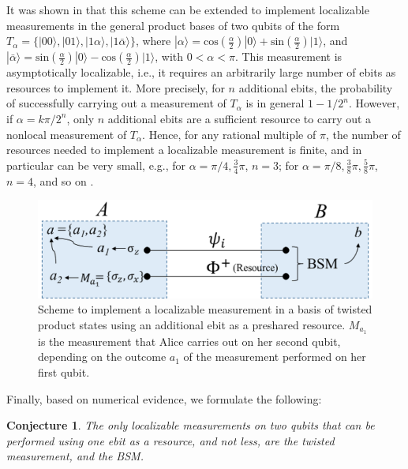 \documentclass[12pt]{article}
\newcommand{\ket}[1]{| {#1} \rangle} %
\newtheorem{conj}{Conjecture}
\begin{document}
It was shown in \cite{groisman2002measurements, groisman2003instantaneous} that this scheme can be extended to implement localizable measurements in the general product bases of two qubits of the form $T_\alpha=\{\ket{00}, \ket{01}, \ket{1   \alpha}, \ket{1\bar{\alpha}}\}$, where $\ket{\alpha}=\text{cos}(\frac{\alpha}{2})\ket 0 + \text{sin}(\frac{\alpha}{2})\ket 1$, and $\ket{\bar \alpha}=\text{sin}(\frac{\alpha}{2})\ket 0 - \text{cos}(\frac{\alpha}{2})\ket 1$, with $0<\alpha<\pi$. This measurement is asymptotically localizable, i.e., it requires an arbitrarily large number of ebits as resources to implement it. More precisely, for $n$ additional ebits, the probability of successfully carrying out a measurement of $T_\alpha$ is in general $1-1/2^n$. However, if $\alpha=k\pi/2^n$, only $n$ additional ebits are a sufficient resource to carry out a nonlocal measurement of $T_{\alpha}$. Hence, for any rational multiple of $\pi$, the number of resources needed to implement a localizable measurement is finite, and in particular can be very small, e.g., for $\alpha=\pi/4, \frac{3}{4}\pi$, $n=3$; for $\alpha=\pi/8, \frac{3}{8}\pi, \frac{5}{8}\pi$, $n=4$, and so on  \cite{groisman2002measurements}. 

 \begin{figure}[ht]
    \centering    \includegraphics[width=.48\textwidth]{twisted_local.png}
    \caption{Scheme to implement a localizable measurement in a basis of  twisted product  states using an additional ebit as a preshared resource. $M_{a_1}$ is the measurement that Alice carries out on her second qubit, depending on the outcome $a_1$ of the measurement performed on her first qubit.}
    \label{fig3}
\end{figure}


Finally, based on numerical evidence, we formulate the following:
\begin{conj}
    The only localizable measurements on two qubits that can be performed using one ebit as a resource, and not less, are the twisted measurement, and the BSM.
\end{conj}
\end{document}

